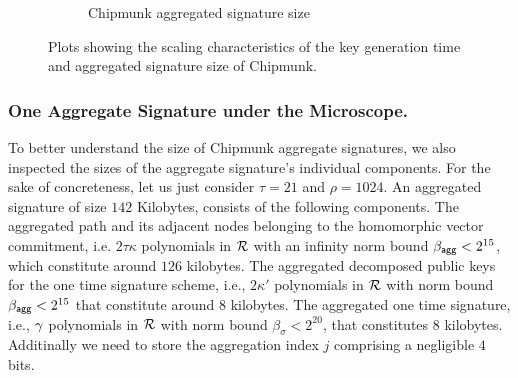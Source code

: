 \begin{figure}
\begin{subfigure}[b]{0.49\textwidth}
  \caption{Chipmunk aggregated signature size}
  \label{fig:sigize}
  \end{subfigure}
  \caption{Plots showing the scaling characteristics of the key generation time and aggregated signature size of Chipmunk.} \label{fig:keygen}
\end{figure}

\subsubsection{One Aggregate Signature under the Microscope.}
To better understand the size of Chipmunk aggregate signatures, we also inspected the sizes of the aggregate signature's individual components.
For the sake of concreteness, let us just consider $\tau=21$ and $\rho=1024$.
An aggregated signature of size $142$ Kilobytes, consists of the following components.
The aggregated path and its adjacent nodes belonging to the homomorphic vector commitment, i.e. $2\tau\kappa$ polynomials in $\mathcal{R}$ with an infinity norm bound $\beta_{\mathsf{agg}} <2^{15}$, which constitute around $126$ kilobytes.
The aggregated decomposed public keys for the one time signature scheme, i.e., $2\kappa'$ polynomials in $\mathcal{R}$ with norm bound $\beta_{\mathsf{agg}} < 2^{15}$ that constitute around $8$ kilobytes.
The aggregated one time signature, i.e., $\gamma$ polynomials in $\mathcal{R}$ with norm bound $\beta_\sigma < 2^{20}$, that constitutes $8$ kilobytes.
Additinally we need to store the aggregation index $j$ comprising a negligible $4$ bits.
